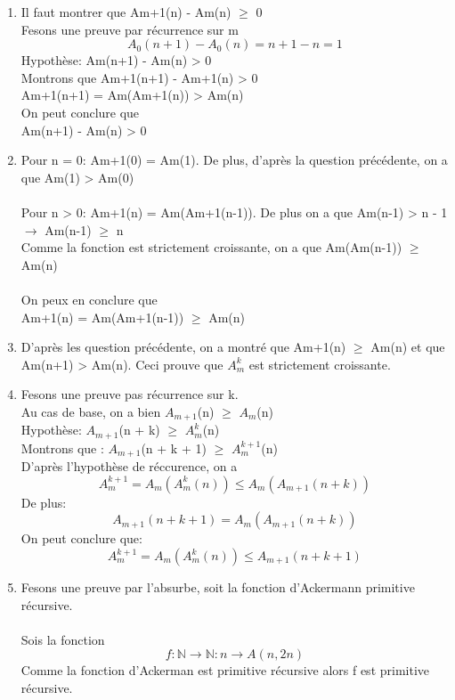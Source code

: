 \documentclass[]{article}
\begin{document}
\begin{enumerate}
\begin{enumerate}
\item  Il faut montrer que A\tiny m+1\normalsize (n) - A\tiny m\normalsize (n)  $\ge$ 0\\
Fesons une preuve par récurrence sur m \\
\[A_0(n+1) - A_0(n) = n + 1 - n = 1\] 
Hypothèse: A\tiny m\normalsize (n+1) - A\tiny m\normalsize (n) > 0\\
Montrons que A\tiny m+1\normalsize (n+1) - A\tiny m+1\normalsize (n) > 0\\
A\tiny m+1\normalsize (n+1) = A\tiny m\normalsize (A\tiny m+1\normalsize (n)) > A\tiny m\normalsize (n)\\
On peut conclure que\\ 
A\tiny m\normalsize (n+1) - A\tiny m\normalsize (n) > 0

\item 
Pour n = 0: A\tiny m+1\normalsize (0) = A\tiny m\normalsize (1). De plus, d'après la question précédente, on a que A\tiny m\normalsize (1) > A\tiny m\normalsize (0)\\\\
Pour n > 0: A\tiny m+1\normalsize (n) = A\tiny m\normalsize (A\tiny m+1\normalsize (n-1)). De plus on a que A\tiny m\normalsize (n-1) > n - 1 $\rightarrow$ A\tiny m\normalsize (n-1) $\ge$ n\\
Comme la fonction est strictement croissante, on a que  A\tiny m\normalsize (A\tiny m\normalsize (n-1)) $\ge$ A\tiny m\normalsize (n) \\ \\
On peux en conclure que \\
A\tiny m+1\normalsize (n) = A\tiny m\normalsize (A\tiny m+1\normalsize (n-1)) $\ge$ A\tiny m\normalsize (n) 

\item D'après les question précédente, on a montré que A\tiny m+1\normalsize (n) $\ge$ A\tiny m\normalsize (n) et que A\tiny m\normalsize (n+1) > A\tiny m\normalsize (n). Ceci prouve que $A_m^k$ est strictement croissante. 

\item Fesons une preuve pas récurrence sur k.\\
Au cas de base, on a bien $A_{m+1}$\normalsize (n) $\ge$ $A_m$\normalsize (n)\\
Hypothèse: $A_{m+1}$\normalsize (n + k) $\ge$ $A^k_m$\normalsize (n)\\
Montrons que : $A_{m+1}$(n + k + 1) $\ge$ $A^{k+1}_m$(n)\\
D'après l'hypothèse de réccurence, on a \\
\[A^{k+1}_m = A_m(A^k_m(n)) \le A_m(A_{m+1}(n + k))\] 
De plus:\\
\[A_{m+1}(n + k + 1) = A_m(A_{m+1}(n + k))\]
On peut conclure que:\\
\[A^{k+1}_m = A_m(A^k_m(n)) \le A_{m+1}(n + k + 1)\]
\item 
Fesons une preuve par l'absurbe, soit la fonction d'Ackermann primitive récursive.\\\\
Sois la fonction \[f: \mathbb{N} \rightarrow \mathbb{N} : n \rightarrow A(n,2n)\]
Comme la fonction d'Ackerman est primitive récursive alors f est primitive récursive.   


\end{enumerate}
\end{enumerate}
\end{document}
